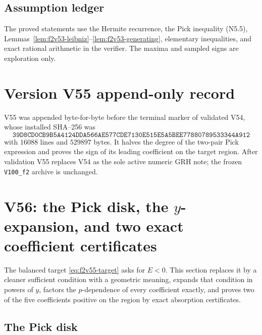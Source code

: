 \documentclass[11pt]{article}
\theoremstyle{definition}
\theoremstyle{remark}
\begin{document}
\subsection*{Assumption ledger}
\label{ass:f2v55}
The proved statements use the Hermite recurrence, the Pick inequality
\textup{(N5.5)}, Lemmas~\ref{lem:f2v53-leibniz}--\ref{lem:f2v53-generating},
elementary inequalities, and exact rational arithmetic in the verifier.
The maxima and sampled signs are exploration only.
\endgroup

\section*{Version V55 append-only record}

V55 was appended byte-for-byte before the terminal marker of validated
V54, whose installed SHA--256 was
\[
 \texttt{39D8CD0CB9B5A4124DDA566AE577CDE7}
 \allowbreak\texttt{130E515E5A5BEE77880789533344A912}
\]
with \(16088\) lines and \(529897\) bytes.  It halves the degree of the
two-pair Pick expression and proves the sign of its leading coefficient
on the target region.  After validation V55 replaces V54 as the sole
active numeric GRH note; the frozen \texttt{V100\_f2} archive is
unchanged.





\clearpage
\section{V56: the Pick disk, the \texorpdfstring{\(y\)}{y}-expansion, and two exact coefficient certificates}
\label{sec:f2v56-pick-disk}
\begingroup
\setcounter{equation}{0}
\renewcommand{\theequation}{N56.\arabic{equation}}
\renewcommand{\theHequation}{f2v56.\arabic{equation}}

The balanced target \eqref{eq:f2v55-target} asks for \(E<0\).  This
section replaces it by a cleaner sufficient condition with a geometric
meaning, expands that condition in powers of \(y\), factors the
\(p\)-dependence of every coefficient exactly, and proves two of the five
coefficients positive on the region by exact absorption certificates.

\subsection{The Pick disk}
\end{document}
